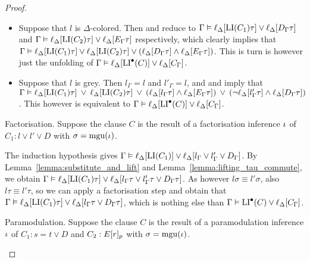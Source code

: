 \begin{proof}
\begin{description}
\begin{itemize}
				\item Suppose that $l$ is $\Delta$-colored.
					Then \markA{} and \markB{} reduce to 
					$\Gamma \vDash \ell_{\Delta}[\operatorname{LI}(C_1)\tau] \lor \ell_{\Delta}[D_\Gamma\tau]$
					and
					$\Gamma \vDash \ell_{\Delta}[\operatorname{LI}(C_2)\tau] \lor \ell_{\Delta}[E_\Gamma\tau]$
					respectively,
					which clearly implies that 
					$\Gamma \vDash \ell_{\Delta}[\operatorname{LI}(C_1)\tau] \lor \ell_{\Delta}[\operatorname{LI}(C_2)\tau] \lor (\ell_{\Delta}[D_\Gamma\tau] \land \ell_{\Delta}[E_\Gamma\tau])$.
					This is turn is however just the unfolding of
					$\Gamma \vDash \ell_{\Delta}[\operatorname{LI}^\bullet(C)] \lor \ell_{\Delta}[C_\Gamma]$.

				\item Suppose that $l$ is grey.
					Then $l_\Gamma = l$ and $l'_\Gamma = l$, and 
					\markA{} and \markB{} imply that
					$\Gamma \vDash
					\ell_{\Delta}[\operatorname{LI}(C_1)\tau] \;\,{\lor}\;\,
					\ell_{\Delta}[\operatorname{LI}(C_2)\tau] \;\,{\lor}\;\,\allowbreak
					(\ell_{\Delta}[l_\Gamma\tau] \land \ell_{\Delta}[E_\Gamma\tau]) \;\,{\lor}\;\,\allowbreak
					(\lnot\ell_{\Delta}[l'_\Gamma\tau] \land \ell_{\Delta}[D_\Gamma\tau])$.
					This however is equivalent to
					$\Gamma \vDash \ell_{\Delta}[\operatorname{LI}^\bullet(C)] \lor \ell_{\Delta}[C_\Gamma]$.

			\end{itemize}

		\item{} Factorisation. 
			Suppose the clause $C$ is the result of a factorisation inference $\iota$ of $C_1: l \lor l' \lor D$ with $\sigma=\operatorname{mgu}(\iota)$.

			The induction hypothesis gives $\Gamma \vDash \ell_{\Delta}[ \operatorname{LI}(C_1) ] \lor \ell_{\Delta}[ l_\Gamma \lor l'_\Gamma \lor D_\Gamma ]$.
			By Lemma~\ref{lemma:substitute_and_lift}
			and Lemma~\ref{lemma:lifting_tau_commute}, we obtain
			$\Gamma \vDash \ell_{\Delta}[ \operatorname{LI}(C_1)\tau ] \lor \ell_{\Delta}[ l_\Gamma\tau \lor l'_\Gamma\tau \lor D_\Gamma\tau ]$.
			As however $l\sigma \equiv l'\sigma$, 
			also $l\tau \equiv l'\tau$, so we can apply a factorisation step and obtain that
			$\Gamma \vDash \ell_{\Delta}[ \operatorname{LI}(C_1)\tau ] \lor \ell_{\Delta}[ l_\Gamma\tau \lor D_\Gamma\tau ]$,
			which is nothing else than $\Gamma \vDash \operatorname{LI}^\bullet(C) \lor \ell_{\Delta}[C_\Gamma]$.

		\item{} Paramodulation.
			Suppose the clause $C$ is the result of a paramodulation inference\nolinebreak{} $\iota$ of $C_1: s=t \lor D$ and $C_2: E{[r]_{p}}$ with $\sigma=\operatorname{mgu}(\iota)$.


\end{description}
\end{proof}

